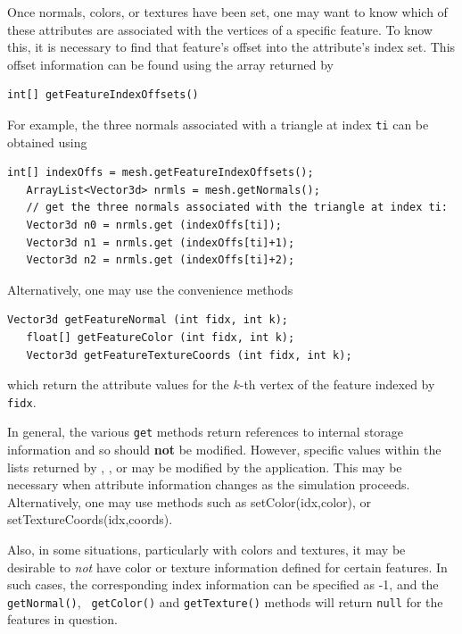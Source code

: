 Once normals, colors, or textures have been set, 
one may want to know which of these attributes are
associated with the vertices of a specific feature. To know this,
it is necessary to find that feature's offset into the 
attribute's index set. This offset information can
be found using the array returned by
\begin{lstlisting}[]
  int[] getFeatureIndexOffsets()
\end{lstlisting}
%
For example, the three normals associated with a triangle at index
{\tt ti} can be obtained using
%
\begin{lstlisting}[]
   int[] indexOffs = mesh.getFeatureIndexOffsets();
   ArrayList<Vector3d> nrmls = mesh.getNormals();
   // get the three normals associated with the triangle at index ti:
   Vector3d n0 = nrmls.get (indexOffs[ti]);
   Vector3d n1 = nrmls.get (indexOffs[ti]+1);
   Vector3d n2 = nrmls.get (indexOffs[ti]+2);
\end{lstlisting}
%
Alternatively, one may use the convenience methods
\begin{lstlisting}[]
   Vector3d getFeatureNormal (int fidx, int k);
   float[] getFeatureColor (int fidx, int k);
   Vector3d getFeatureTextureCoords (int fidx, int k);
\end{lstlisting}
%
which return the attribute values for the $k$-th vertex of
the feature indexed by {\tt fidx}.

In general, the various {\tt get} methods return references to
internal storage information and so should
{\bf not} be modified. However, specific values within the lists
returned by 
, 
, or
may be modified by the application.  This may be
necessary when attribute information changes as the simulation
proceeds. Alternatively, one may use methods such
as 
%
{setColor(idx,color)}, or
%
{setTextureCoords(idx,coords)}.

Also, in some situations, particularly with colors and textures, it
may be desirable to {\it not} have color or texture information
defined for certain features. In such cases, the corresponding index
information can be specified as -1, and the {\tt getNormal()}, {\tt
getColor()} and {\tt getTexture()} methods will return {\tt null} for
the features in question.

